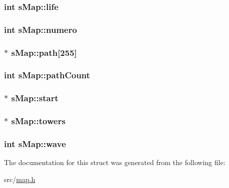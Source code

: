 \hypertarget{structs_map_a7ac656eb61c1fd86f15eb6a36df144e8}{
\subsubsection[{life}]{\setlength{\rightskip}{0pt plus 5cm}int s\-Map\-::life}}\label{structs_map_a7ac656eb61c1fd86f15eb6a36df144e8}
\hypertarget{structs_map_a87168578fa698ab88b296e3d113d8af2}{
\subsubsection[{numero}]{\setlength{\rightskip}{0pt plus 5cm}int s\-Map\-::numero}}\label{structs_map_a87168578fa698ab88b296e3d113d8af2}
\hypertarget{structs_map_a7b410c58024a707229d3c7ec832bdf27}{
\subsubsection[{path}]{$\ast$ s\-Map\-::path\mbox{[}255\mbox{]}}}\label{structs_map_a7b410c58024a707229d3c7ec832bdf27}
\hypertarget{structs_map_a1d8b95b78adb7ddb2381de089e870991}{
\subsubsection[{path\-Count}]{\setlength{\rightskip}{0pt plus 5cm}int s\-Map\-::path\-Count}}\label{structs_map_a1d8b95b78adb7ddb2381de089e870991}
\hypertarget{structs_map_aa50747972cf5e8c17c9927eb8b0439c7}{
\subsubsection[{start}]{$\ast$ s\-Map\-::start}}\label{structs_map_aa50747972cf5e8c17c9927eb8b0439c7}
\hypertarget{structs_map_a93cab5b7e4f3205c43335147e2a3f066}{
\subsubsection[{towers}]{$\ast$ s\-Map\-::towers}}\label{structs_map_a93cab5b7e4f3205c43335147e2a3f066}
\hypertarget{structs_map_abe7b6a265689239f6a6ffbcfd95508be}{
\subsubsection[{wave}]{\setlength{\rightskip}{0pt plus 5cm}int s\-Map\-::wave}}\label{structs_map_abe7b6a265689239f6a6ffbcfd95508be}


The documentation for this struct was generated from the following file\-:\begin{DoxyCompactItemize}
\item 
src/\hyperlink{map_8h}{map.\-h}\end{DoxyCompactItemize}
